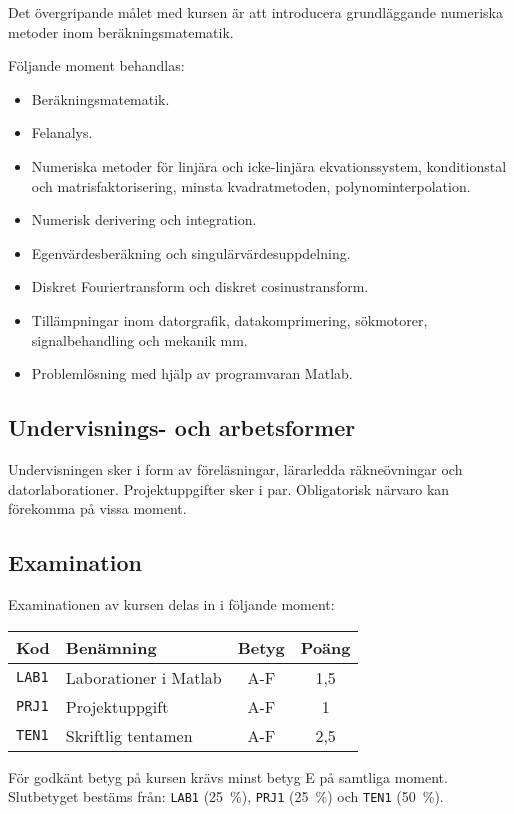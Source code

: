Det övergripande målet med kursen är att introducera grundläggande
numeriska metoder inom beräkningsmatematik.

Följande moment behandlas:

\begin{itemize}
\tightlist
\item
  Beräkningsmatematik.
\item
  Felanalys.
\item
  Numeriska metoder för linjära och icke-linjära ekvationssystem,
  konditionstal och matrisfaktorisering, minsta kvadratmetoden,
  polynominterpolation.
\item
  Numerisk derivering och integration.
\item
  Egenvärdesberäkning och singulärvärdesuppdelning.
\item
  Diskret Fouriertransform och diskret cosinustransform.\\
\item
  Tillämpningar inom datorgrafik, datakomprimering, sökmotorer,
  signalbehandling och mekanik mm.
\item
  Problemlösning med hjälp av programvaran Matlab.
\end{itemize}

\subsection*{Undervisnings- och
arbetsformer}

Undervisningen sker i form av föreläsningar, lärarledda räkneövningar
och datorlaborationer. Projektuppgifter sker i par. Obligatorisk närvaro
kan förekomma på vissa moment.

\subsection*{Examination}

Examinationen av kursen delas in i följande moment:

\begin{longtable}[]{@{}llcc@{}}
\toprule
\textsf{Kod} & \textsf{Benämning} & \textsf{Betyg} & \textsf{Poäng}\tabularnewline
\midrule
\endhead
\texttt{LAB1} & Laborationer i Matlab & A-F & 1,5\tabularnewline
\texttt{PRJ1} & Projektuppgift & A-F & 1\tabularnewline
\texttt{TEN1} & Skriftlig tentamen & A-F & 2,5\tabularnewline
\bottomrule
\end{longtable}

För godkänt betyg på kursen krävs minst betyg E på samtliga moment.
Slutbetyget bestäms från: \texttt{LAB1} (25~\%), \texttt{PRJ1} (25~\%) och \texttt{TEN1} (50~\%).


